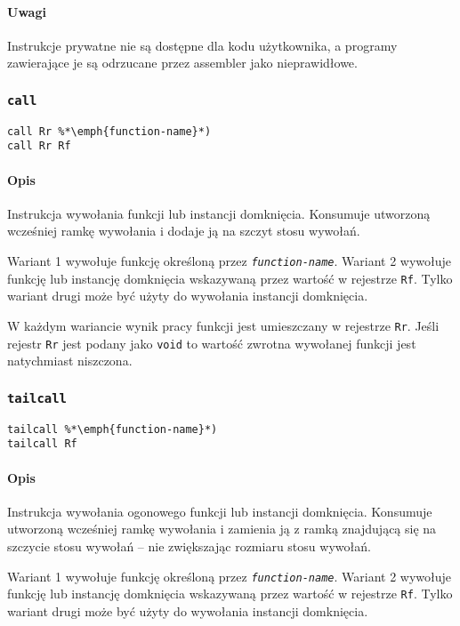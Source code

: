\paragraph*{Uwagi}

Instrukcje prywatne nie są dostępne dla kodu użytkownika, a programy zawierające
je są odrzucane przez assembler jako nieprawidłowe.

\subsubsection{\texttt{call}}

\begin{lstlisting}
call Rr %*\emph{function-name}*)
call Rr Rf
\end{lstlisting}

\paragraph*{Opis} Instrukcja wywołania funkcji lub instancji domknięcia.
Konsumuje utworzoną wcześniej ramkę wywołania i dodaje ją na szczyt stosu
wywołań.

Wariant 1 wywołuje funkcję określoną przez \texttt{\emph{function-name}}.
Wariant 2 wywołuje funkcję lub instancję domknięcia wskazywaną przez wartość w
rejestrze \texttt{Rf}. Tylko wariant drugi może być użyty do wywołania instancji
domknięcia.

W każdym wariancie wynik pracy funkcji jest umieszczany w rejestrze \texttt{Rr}.
Jeśli rejestr \texttt{Rr} jest podany jako \texttt{void} to wartość zwrotna
wywołanej funkcji jest natychmiast niszczona.

\subsubsection{\texttt{tailcall}}

\begin{lstlisting}
tailcall %*\emph{function-name}*)
tailcall Rf
\end{lstlisting}

\paragraph*{Opis} Instrukcja wywołania ogonowego funkcji lub instancji
domknięcia. Konsumuje utworzoną wcześniej ramkę wywołania i zamienia ją z ramką
znajdującą się na szczycie stosu wywołań -- nie zwiększając rozmiaru stosu
wywołań.

Wariant 1 wywołuje funkcję określoną przez \texttt{\emph{function-name}}.
Wariant 2 wywołuje funkcję lub instancję domknięcia wskazywaną przez wartość w
rejestrze \texttt{Rf}. Tylko wariant drugi może być użyty do wywołania instancji
domknięcia.

